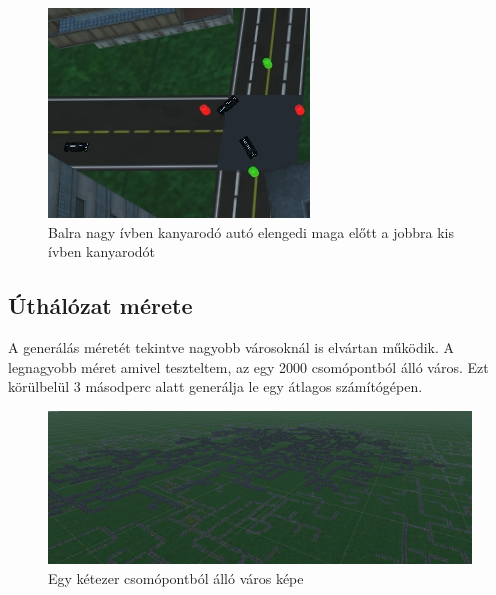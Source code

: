 \begin{figure}[H]
\includegraphics[width=\linewidth]{rofway.png}
\caption{Balra nagy ívben kanyarodó autó elengedi maga előtt a jobbra kis ívben kanyarodót}
\label{fig:rightofway}
\end{figure}

\subsection{Úthálózat mérete}
A generálás méretét tekintve nagyobb városoknál is elvártan működik. A legnagyobb méret amivel teszteltem, az egy 2000 csomópontból álló város. Ezt körülbelül 3 másodperc alatt generálja le egy átlagos számítógépen.
\begin{figure}[H]
\includegraphics[width=\linewidth]{verybig.png}
\caption{Egy kétezer csomópontból álló város képe}
\label{fig:verybigcity}
\end{figure}

